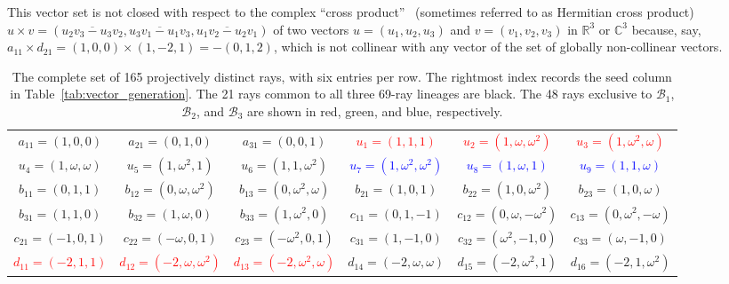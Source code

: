 \documentclass[%
  reprint,
  superscriptaddress,
  showpacs,
  showkeys,
  amsmath,amssymb,
  pra,
  longbibliography,
  floatfix,
  x11names
]{revtex4-2}
\newcommand{\rev}[1]{{\color{revisionblue}#1}}
\begin{document}
This vector set is not closed with respect to the complex ``cross product''~\cite{harding2025remarksIJTP} (sometimes referred to as Hermitian cross product)
\(
u\times v =  (\overline{u_2v_3-u_3v_2},\overline{u_3v_1-u_1v_3},\overline{u_1v_2-u_2v_1})
\)
of two vectors $u=(u_1,u_2,u_3)$ and $v=(v_1,v_2,v_3)$ in $\mathbb{R}^3$ or $\mathbb{C}^3$ because, say,
$a_{11} \times d_{21} = (1,0,0) \times (1,-2,1) = -(0,1,2)$, which is not collinear with any vector of the set of globally non-collinear vectors.



\begin{table}[htbp!]
\caption{
\rev{The complete set of 165 projectively distinct rays, with six entries per row.  The rightmost index records the seed column in Table~\ref{tab:vector_generation}.  The 21 rays common to all three 69-ray lineages are black.  The 48 rays exclusive to $\mathcal{B}_1$, $\mathcal{B}_2$, and $\mathcal{B}_3$ are shown in red, green, and blue, respectively.}
}
\label{tab:noncollinear_vectors_6col}
\footnotesize %
\begin{ruledtabular}
\begin{tabular}{*{6}{c}} %
{$a_{11}=(1,0,0)$} & {$a_{21}=(0,1,0)$} & {$a_{31}=(0,0,1)$} & \textcolor{red}{$u_{1}=(1,1,1)$} & \textcolor{red}{$u_{2}=(1,\omega,\omega^2)$} & \textcolor{red}{$u_{3}=(1,\omega^2,\omega)$} \\
\textcolor{green!40!black}{$u_{4}=(1,\omega,\omega)$} & \textcolor{green!40!black}{$u_{5}=(1,\omega^2,1)$} & \textcolor{green!40!black}{$u_{6}=(1,1,\omega^2)$} & \textcolor{blue}{$u_{7}=(1,\omega^2,\omega^2)$} & \textcolor{blue}{$u_{8}=(1,\omega,1)$} & \textcolor{blue}{$u_{9}=(1,1,\omega)$} \\
{$b_{11}=(0,1,1)$} & {$b_{12}=(0,\omega,\omega^2)$} & {$b_{13}=(0,\omega^2,\omega)$} & {$b_{21}=(1,0,1)$} & {$b_{22}=(1,0,\omega^2)$} & {$b_{23}=(1,0,\omega)$} \\
{$b_{31}=(1,1,0)$} & {$b_{32}=(1,\omega,0)$} & {$b_{33}=(1,\omega^2,0)$} & {$c_{11}=(0,1,-1)$} & {$c_{12}=(0,\omega,-\omega^2)$} & {$c_{13}=(0,\omega^2,-\omega)$} \\
{$c_{21}=(-1,0,1)$} & {$c_{22}=(-\omega,0,1)$} & {$c_{23}=(-\omega^2,0,1)$} & {$c_{31}=(1,-1,0)$} & {$c_{32}=(\omega^2,-1,0)$} & {$c_{33}=(\omega,-1,0)$} \\
\textcolor{red}{$d_{11}=(-2,1,1)$} & \textcolor{red}{$d_{12}=(-2,\omega,\omega^2)$} & \textcolor{red}{$d_{13}=(-2,\omega^2,\omega)$} & \textcolor{green!40!black}{$d_{14}=(-2,\omega,\omega)$} & \textcolor{green!40!black}{$d_{15}=(-2,\omega^2,1)$} & \textcolor{green!40!black}{$d_{16}=(-2,1,\omega^2)$} \\

\end{tabular}
\end{ruledtabular}
\end{table}
\end{document}
